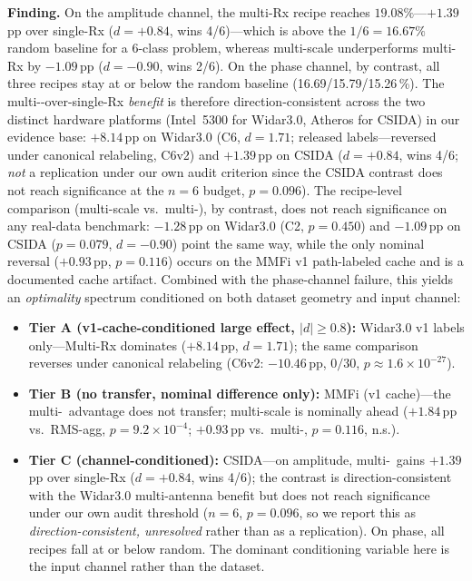 \documentclass[journal,11pt]{IEEEtran}
\newcommand{\Rx}{\text{Rx}}
\begin{document}
\textbf{Finding.} On the amplitude channel, the multi-Rx recipe reaches $19.08\%$---$+1.39$\,pp over single-Rx ($d = +0.84$, wins 4/6)---which is above the $1/6 = 16.67\%$ random baseline for a 6-class problem, whereas multi-scale underperforms multi-Rx by $-1.09$\,pp ($d = -0.90$, wins 2/6). On the phase channel, by contrast, all three recipes stay at or below the random baseline (16.69/15.79/15.26\,\%). The multi-\Rx{}-over-single-Rx \emph{benefit} is therefore direction-consistent across the two distinct hardware platforms (Intel~5300 for Widar3.0, Atheros for CSIDA) in our evidence base: $+8.14$\,pp on Widar3.0 (C6, $d = 1.71$; released labels---reversed under canonical relabeling, C6v2) and $+1.39$\,pp on CSIDA ($d = +0.84$, wins 4/6; \emph{not} a replication under our own audit criterion since the CSIDA contrast does not reach significance at the $n = 6$ budget, $p = 0.096$). The recipe-level comparison (multi-scale vs.\ multi-\Rx), by contrast, does not reach significance on any real-data benchmark: $-1.28$\,pp on Widar3.0 (C2, $p = 0.450$) and $-1.09$\,pp on CSIDA ($p = 0.079$, $d = -0.90$) point the same way, while the only nominal reversal ($+0.93$\,pp, $p = 0.116$) occurs on the MMFi v1 path-labeled cache and is a documented cache artifact. Combined with the phase-channel failure, this yields an \emph{optimality} spectrum conditioned on both dataset geometry and input channel:

\begin{itemize}
    \item \textbf{Tier A (v1-cache-conditioned large effect, $|d| \geq 0.8$):} Widar3.0 v1 labels only---Multi-Rx dominates ($+8.14$\,pp, $d = 1.71$); the same comparison reverses under canonical relabeling (C6v2: $-10.46$\,pp, $0/30$, $p \approx 1.6\times10^{-27}$).
    \item \textbf{Tier B (no transfer, nominal difference only):} MMFi (v1 cache)---the multi-\Rx\ advantage does not transfer; multi-scale is nominally ahead ($+1.84$\,pp vs.\ RMS-agg, $p = 9.2\times10^{-4}$; $+0.93$\,pp vs.\ multi-\Rx, $p = 0.116$, n.s.).
    \item \textbf{Tier C (channel-conditioned):} CSIDA---on amplitude, multi-\Rx\ gains $+1.39$\,pp over single-Rx ($d = +0.84$, wins 4/6); the contrast is direction-consistent with the Widar3.0 multi-antenna benefit but does not reach significance under our own audit threshold ($n = 6$, $p = 0.096$, so we report this as \emph{direction-consistent, unresolved} rather than as a replication). On phase, all recipes fall at or below random. The dominant conditioning variable here is the input channel rather than the dataset.
\end{itemize}
\end{document}
